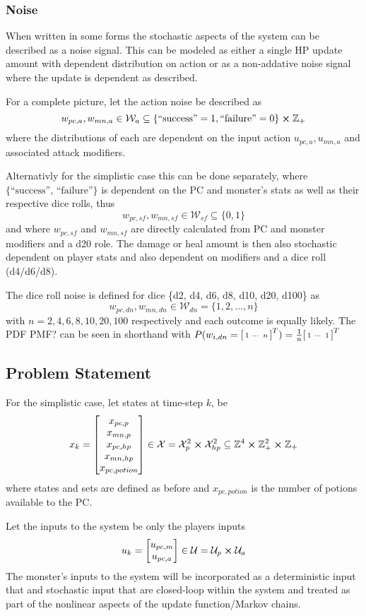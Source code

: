 \documentclass[9pt, onecolumn]{report}
\newcommand{\Z}{\mathbb{Z}}
\begin{document}
\subsubsection{Noise}
When written in some forms the stochastic aspects of the system can be described as a noise signal.
This can be modeled as either a single HP update amount with dependent distribution on action or as a non-addative noise signal where the update is dependent as described. 

For a complete picture, let the action noise be described as \[
    w_{pc,a}, w_{mn,a} \in \mathcal{W}_{a} \subseteq \{\text{``success''} = 1, \text{``failure''} = 0\} \cross \Z_{+}
\] where the distributions of each are dependent on the input action $u_{pc,a}, u_{mn,a}$ and associated attack modifiers.

Alternativly for the simplistic case this can be done separately, where $\{\text{``success'', ``failure''}\}$ is dependent on the PC and monster's stats as well as their respective dice rolls, thus \[
    w_{pc,sf}, w_{mn,sf} \in \mathcal{W}_{sf} \subseteq \{0, 1\}
\] and where $w_{pc,sf}$ and $w_{mn,sf}$ are directly calculated from PC and monster modifiers and a d20 role.
The damage or heal amount is then also stochastic dependent on player stats and also dependent on modifiers and a dice roll (d4/d6/d8).

The dice roll noise is defined for dice \{d2, d4, d6, d8, d10, d20, d100\} as 
\[
    w_{pc,dn}, w_{mn,dn} \in \mathcal{W}_{dn} = \{1,2,\dots,n\}
\] with $n = 2,4,6,8,10,20,100$ respectively and each outcome is equally likely.
The PDF {\color{red} PMF?} can be seen in shorthand with $P(w_{i,dn} = \smqty[1 & \cdots & n]^T) = \frac{1}{n}\smqty[1 & \cdots & 1]^T$

\subsection{Problem Statement}
For the simplistic case, let states at time-step $k$, be \[
    x_k = \mqty[x_{pc,p}\\x_{mn,p}\\x_{pc,hp}\\x_{mn,hp}\\ x_{pc,potion}] \in \mathcal{X} = \mathcal{X}_p^2 \cross \mathcal{X}_{hp}^2 \subseteq \Z^{4} \cross \Z_{+}^{2} \cross \Z_{+}
\] where states and sets are defined as before and $x_{pc,potion}$ is the number of potions available to the PC.

Let the inputs to the system be only the players inputs \[
    u_k = \mqty[u_{pc,m}\\u_{pc,a}] \in \mathcal{U} = \mathcal{U}_{p} \cross \mathcal{U}_{a} %
\] The monster's inputs to the system will be incorporated as a deterministic input that and stochastic input that are closed-loop within the system and treated as part of the nonlinear aspects of the update function/Markov chains.
\end{document}
